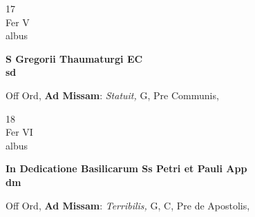 \documentclass[10pt, openany]{book}
\begin{document}
        \begin{center}
            \begin{minipage}{3.5in}
                \vspace{2em}
                \begin{minipage}{0.5in}
                    {\Huge 17} \\
                    {\normalsize Fer V} \\
                    {\normalsize albus}
                \end{minipage}
                \begin{minipage}{3.0in}
                    \textbf{ \large S Gregorii Thaumaturgi EC \\
                    \textnormal{\normalsize sd}} \\ 
                \end{minipage}
                \begin{justify}Off Ord, \textbf{Ad Missam}: \textit{Statuit,} G, Pre Communis,   
                \end{justify}
            \end{minipage}
        \end{center}
    
        \begin{center}
            \begin{minipage}{3.5in}
                \vspace{2em}
                \begin{minipage}{0.5in}
                    {\Huge 18} \\
                    {\normalsize Fer VI} \\
                    {\normalsize albus}
                \end{minipage}
                \begin{minipage}{3.0in}
                    \textbf{ \large In Dedicatione Basilicarum Ss Petri et Pauli App \\
                    \textnormal{\normalsize dm}} \\ 
                \end{minipage}
                \begin{justify}Off Ord, \textbf{Ad Missam}: \textit{Terribilis,} G, C, Pre de Apostolis,   
                \end{justify}
            \end{minipage}
        \end{center}
    
\end{document}
